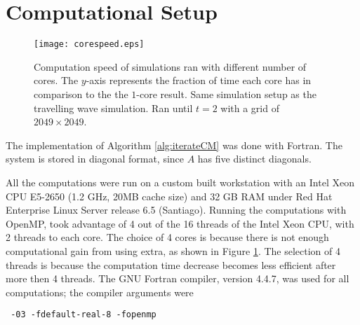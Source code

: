 \section{Computational Setup}

\begin{figure}[h!tb]
  \centering
  \texttt{[image: corespeed.eps]}
  \caption{Computation speed of simulations ran with different number of cores.
    The $y$-axis represents the fraction of time each core has in comparison to the the $1$-core result.
    Same simulation setup as the travelling wave simulation.
    Ran until $t = 2$ with a grid of $2049 \times 2049$. }
  \label{fig:corespeed}
\end{figure}

The implementation of Algorithm \ref{alg:iterateCM} was done with Fortran. 
The system is stored in diagonal format, since $A$ has five distinct diagonals.

All the computations were run on a custom built workstation with an Intel Xeon CPU E5-2650 (1.2 GHz, 20MB cache size) and 32 GB RAM under Red Hat Enterprise Linux Server release 6.5 (Santiago). 
Running the computations with OpenMP, took advantage of 4 out of the 16 threads of the Intel Xeon CPU, with 2 threads to each core.
The choice of 4 cores is because there is not enough computational gain from using extra, as shown in Figure \ref{fig:corespeed}.
The selection of 4 threads is because the computation time decrease becomes less efficient after more then 4 threads. 
The GNU Fortran compiler, version 4.4.7, was used for all computations; the compiler arguments were
\begin{verbatim} -03 -fdefault-real-8 -fopenmp \end{verbatim}




